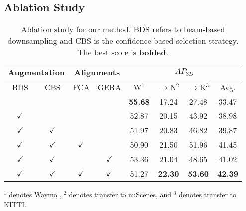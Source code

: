 \subsection{Ablation Study}
\begin{table}[t!]
    \centering
    \caption{Ablation study for our method. BDS refers to beam-based downsampling and CBS is the confidence-based selection strategy. The best score is \textbf{bolded}.}
    \begin{tabular}{c c | c c | c | c c | c}
    \toprule[1.5pt]

    \multicolumn{2}{c|}{Augmentation} & \multicolumn{2}{c|}{Alignments}
    & \multicolumn{4}{c}{$\SI{}{AP_{3D}}$} \\ \hline

    BDS & CBS & FCA & GERA & W$^{1}$ & $\rightarrow$N$^{2}$ & $\rightarrow$K$^{3}$ & Avg. \\ \hline

    & & & & \textbf{55.68} & 17.24 & 27.48 & 33.47 \\

    $\checkmark$ & & & & 52.87 & 20.15 & 43.92 & 38.98 \\
    $\checkmark$ & $\checkmark$ & & & 51.97 & 20.83 & 46.82 & 39.87 \\ \hline
    $\checkmark$ & $\checkmark$ & $\checkmark$ & & 50.90 & 21.50 & 51.96 & 41.45 \\
    $\checkmark$ & $\checkmark$ & & $\checkmark$ & 53.36 & 21.04 & 48.65 & 41.02 \\
    $\checkmark$ & $\checkmark$ & $\checkmark$ & $\checkmark$ & 51.27 & \textbf{22.30} & \textbf{53.60} & \textbf{42.39} \\
    
    \bottomrule[1.5pt]
    \end{tabular}

    
$^{1}$ denotes Waymo , $^{2}$ denotes transfer to nuScenes, and $^{3}$ denotes transfer to KITTI.
    \label{tab:ablation}
\end{table}

    
